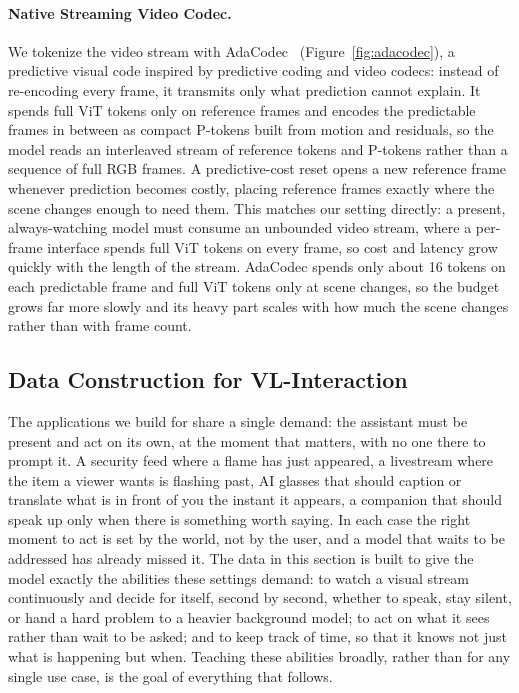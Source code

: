 \paragraph{\textbf{Native Streaming Video Codec.}}
We tokenize the video stream with AdaCodec~\cite{hou2026adacodecpredictivevisualcode} (Figure~\ref{fig:adacodec}), a predictive visual code inspired by predictive coding and video codecs: instead of re-encoding every frame, it transmits only what prediction cannot explain. It spends full ViT tokens only on reference frames and encodes the predictable frames in between as compact P-tokens built from motion and residuals, so the model reads an interleaved stream of reference tokens and P-tokens rather than a sequence of full RGB frames. A predictive-cost reset opens a new reference frame whenever prediction becomes costly, placing reference frames exactly where the scene changes enough to need them. This matches our setting directly: a present, always-watching model must consume an unbounded video stream, where a per-frame interface spends full ViT tokens on every frame, so cost and latency grow quickly with the length of the stream. AdaCodec spends only about 16 tokens on each predictable frame and full ViT tokens only at scene changes, so the budget grows far more slowly and its heavy part scales with how much the scene changes rather than with frame count.





\subsection{Data Construction for VL-Interaction }
\label{sec:data}

The applications we build for share a single demand: the assistant must be present and act on its own, at the moment that matters, with no one there to prompt it. A security feed where a flame has just appeared, a livestream where the item a viewer wants is flashing past, AI glasses that should caption or translate what is in front of you the instant it appears, a companion that should speak up only when there is something worth saying. In each case the right moment to act is set by the world, not by the user, and a model that waits to be addressed has already missed it. The data in this section is built to give the model exactly the abilities these settings demand: to watch a visual stream continuously and decide for itself, second by second, whether to speak, stay silent, or hand a hard problem to a heavier background model; to act on what it sees rather than wait to be asked; and to keep track of time, so that it knows not just what is happening but when. Teaching these abilities broadly, rather than for any single use case, is the goal of everything that follows. 

